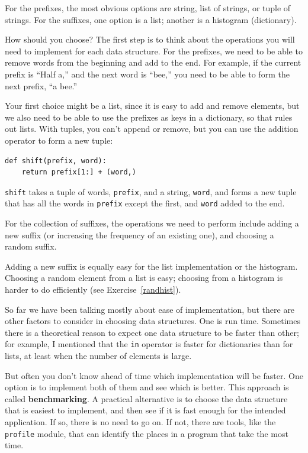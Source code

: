 \documentclass[10pt]{book}
\begin{document}
{For the prefixes, the most obvious options are string,
list of strings, or tuple of strings.  For the suffixes,
one option is a list; another is a histogram (dictionary).


How should you choose?  The first step is to think about
the operations you will need to implement for each data structure.
For the prefixes, we need to be able to remove words from
the beginning and add to the end.  For example, if the current
prefix is ``Half a,'' and the next word is ``bee,'' you need
to be able to form the next prefix, ``a bee.''


Your first choice might be a list, since it is easy to add
and remove elements, but we also need to be able to use the
prefixes as keys in a dictionary, so that rules out lists.
With tuples, you can't append or remove, but you can use
the addition operator to form a new tuple:

\beforeverb
\begin{verbatim}
def shift(prefix, word):
    return prefix[1:] + (word,)
\end{verbatim}
\afterverb
%
{\tt shift} takes a tuple of words, {\tt prefix}, and a string, 
{\tt word}, and forms a new tuple that has all the words
in {\tt prefix} except the first, and {\tt word} added to
the end.

For the collection of suffixes, the operations we need to
perform include adding a new suffix (or increasing the frequency
of an existing one), and choosing a random suffix.

Adding a new suffix is equally easy for the list implementation
or the histogram.  Choosing a random element from a list
is easy; choosing from a histogram is harder to do
efficiently (see Exercise~\ref{randhist}).

So far we have been talking mostly about ease of implementation,
but there are other factors to consider in choosing data structures.
One is run time.  Sometimes there is a theoretical reason to expect
one data structure to be faster than other; for example, I mentioned
that the {\tt in} operator is faster for dictionaries than for lists,
at least when the number of elements is large.

But often you don't know ahead of time which implementation will
be faster.  One option is to implement both of them and see which
is better.  This approach is called {\bf benchmarking}.  A practical
alternative is to choose the data structure that is
easiest to implement, and then see if it is fast enough for the
intended application.  If so, there is no need to go on.  If not,
there are tools, like the {\tt profile} module, that can identify
the places in a program that take the most time.

}
\end{document}
